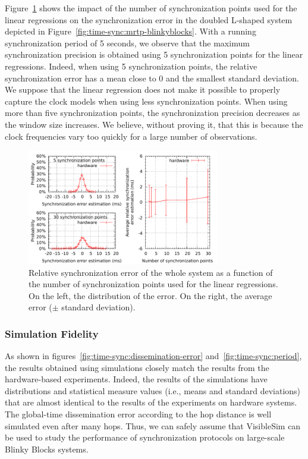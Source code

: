 Figure~\ref{fig:time-sync:window} shows the impact of the number of synchronization points used for the linear regressions on the synchronization error in the doubled L-shaped system depicted in Figure~\ref{fig:time-sync:mrtp-blinkyblocks}. With a running synchronization period of 5 seconds, we observe that the maximum synchronization precision is obtained using 5 synchronization points for the linear regressions. Indeed, when using 5 synchronization points, the relative synchronization error has a mean close to 0 and the smallest standard deviation. We suppose that the linear regression does not make it possible to properly capture the clock models when using less synchronization points. When using more than five synchronization points, the synchronization precision decreases as the window size increases. We believe, without proving it, that this is because the clock frequencies vary too quickly for a large number of observations.

\begin{figure}[h!]
	\begin{center}
		\includegraphics[width=0.75\textwidth]{images/time-synchronization/window.pdf}
	\end{center}
	\caption{Relative synchronization error of the whole system as a function of the number of synchronization points used for the linear regressions. On the left, the distribution of the error. On the right, the average error ($\pm$ standard deviation).\label{fig:time-sync:window}}
\end{figure}

\subsubsection{Simulation Fidelity}

As shown in figures~\ref{fig:time-sync:dissemination-error} and~\ref{fig:time-sync:period}, the results obtained using simulations closely match the results from the hardware-based experiments. Indeed, the results of the simulations have distributions and statistical measure values (i.e., means and standard deviations) that are almost identical to the results of the experiments on hardware systems. The global-time dissemination error according to the hop distance is well simulated even after many hops. Thus, we can safely assume that VisibleSim can be used to study the performance of synchronization protocols on large-scale Blinky Blocks systems.

